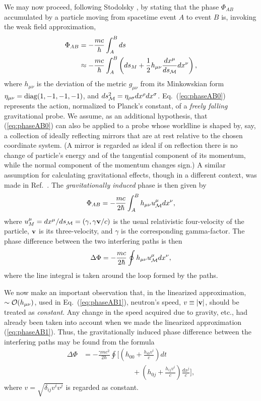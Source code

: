 \documentclass[twocolumn,reprint,amsmath,amssymb]{revtex4}
\def\BEq{\begin{equation}}
\def\EEq{\end{equation}}
\def\d{\delta}
\def\m{\mu}
\def\n{\nu}
\def\r{\rho}
\def\s{\sigma}
\begin{document}
We may now proceed, following Stodolsky \cite{5}, by stating 
that the phase $\Phi_{AB}$ accumulated by a particle moving from
spacetime event $A$ to event $B$ is, invoking the weak field approximation,
\begin{align}
\label{eq:phaseAB0}
\Phi_{AB} &= -\frac{mc}{\hbar}
\int_{A}^{B}ds
\nonumber \\
&\approx 
-\frac{mc}{\hbar}
\int_{A}^{B} 
\left(ds_{M}+\frac{1}{2}h_{\m\n}\frac{dx^\m}{ds_{{\cal M}}}dx^\n\right),
\end{align}
where $h_{\m\n}$ is the deviation of the metric $g_{\m\n}$ from its Minkowskian form
$\eta_{\m\n}={\rm diag}(1,-1,-1,-1)$, and 
$ds_{{\cal M}}^2 = \eta_{\r\s}dx^{\r}dx^{\s}$.
Eq.\ (\ref{eq:phaseAB0}) represents the action, normalized to Planck's constant, of a 
{\it freely falling} gravitational probe. 
We assume, as an additional hypothesis, that (\ref{eq:phaseAB0}) can also be applied to 
a probe whose worldline is shaped by, say, a collection of ideally reflecting mirrors that are at rest relative to the chosen coordinate system.
(A mirror is regarded as ideal if on reflection there is no change of particle's energy and 
of the tangential component of its momentum, while the normal component of the
momentum changes sign.) A similar assumption for calculating gravitational effects, 
though in a different context, was made in Ref.\ \cite{GRISHCHUK74}.
The {\it gravitationally induced} phase is then given by
\BEq
\label{eq:phaseAB1}
\Phi_{AB} =  
-\frac{mc}{2\hbar}
\int_{A}^{B}h_{\m\n} u^{\m}_{{\cal M}}dx^{\n},
\EEq
where 
$u^{\m}_{M}=dx^{\m}/ds_{{\cal M}}=(\gamma, \gamma {\bf v}/c)$
is the usual relativistic four-velocity of the particle, ${\bf v}$ is its three-velocity, and $\gamma$ 
is the corresponding gamma-factor. The phase difference between the two interfering paths is then 
\BEq
\label{eq:phaseAB1LOOP}
\Delta \Phi =  
-\frac{mc}{2\hbar}
\oint  h_{\m\n} u^{\m}_{{\cal M}}dx^{\n},
\EEq
where the line integral is taken around the loop formed by the paths.


We now make an important observation that, in the linearized approximation, 
$\sim{\cal O}(h_{\m\n})$, used in Eq.\ (\ref{eq:phaseAB1}), neutron's speed, 
$v\equiv |{\bf v}|$, should be treated as {\it constant}. Any change in the speed  
acquired due to gravity, etc., had already been taken into account when we made the 
linearized approximation (\ref{eq:phaseAB1}). Thus, the gravitationally induced 
phase difference between the interfering paths may be found from the formula
\begin{align}
\label{eq:phaseAB2}
\Delta \Phi 
&=  
-\frac{\gamma mc^2}{2\hbar}
\oint
\biggl[
\left(h_{00}+ \frac{h_{i0}v^i}{c}\right)dt
\nonumber \\
&\quad\quad\quad\quad\quad\quad\quad
+
\left(h_{0j}+\frac{h_{ij} v^i}{c}\right)\frac{dx^{j}}{c}
\biggr],
\end{align}
where $v=\sqrt{\d_{ij}v^iv^j}$ is regarded as constant.
\end{document}
